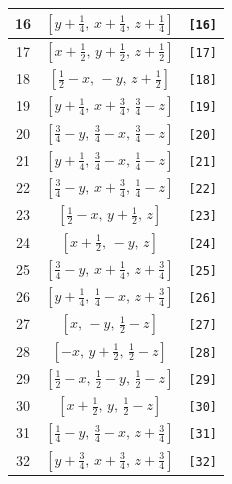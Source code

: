 \documentclass[fleqn,8pt]{jsarticle}
\begin{document}
\begin{longtable}{ccc}
16 & $\left[ y + \frac{1}{4},\, x + \frac{1}{4},\, z + \frac{1}{4} \right]$ & {\tt [16]} \\ \hline
17 & $\left[ x + \frac{1}{2},\, y + \frac{1}{2},\, z + \frac{1}{2} \right]$ & {\tt [17]} \\ \hline
18 & $\left[ \frac{1}{2} - x,\, - y,\, z + \frac{1}{2} \right]$ & {\tt [18]} \\ \hline
19 & $\left[ y + \frac{1}{4},\, x + \frac{3}{4},\, \frac{3}{4} - z \right]$ & {\tt [19]} \\ \hline
20 & $\left[ \frac{3}{4} - y,\, \frac{3}{4} - x,\, \frac{3}{4} - z \right]$ & {\tt [20]} \\ \hline
21 & $\left[ y + \frac{1}{4},\, \frac{3}{4} - x,\, \frac{1}{4} - z \right]$ & {\tt [21]} \\ \hline
22 & $\left[ \frac{3}{4} - y,\, x + \frac{3}{4},\, \frac{1}{4} - z \right]$ & {\tt [22]} \\ \hline
23 & $\left[ \frac{1}{2} - x,\, y + \frac{1}{2},\, z \right]$ & {\tt [23]} \\ \hline
24 & $\left[ x + \frac{1}{2},\, - y,\, z \right]$ & {\tt [24]} \\ \hline
25 & $\left[ \frac{3}{4} - y,\, x + \frac{1}{4},\, z + \frac{3}{4} \right]$ & {\tt [25]} \\ \hline
26 & $\left[ y + \frac{1}{4},\, \frac{1}{4} - x,\, z + \frac{3}{4} \right]$ & {\tt [26]} \\ \hline
27 & $\left[ x,\, - y,\, \frac{1}{2} - z \right]$ & {\tt [27]} \\ \hline
28 & $\left[ - x,\, y + \frac{1}{2},\, \frac{1}{2} - z \right]$ & {\tt [28]} \\ \hline
29 & $\left[ \frac{1}{2} - x,\, \frac{1}{2} - y,\, \frac{1}{2} - z \right]$ & {\tt [29]} \\ \hline
30 & $\left[ x + \frac{1}{2},\, y,\, \frac{1}{2} - z \right]$ & {\tt [30]} \\ \hline
31 & $\left[ \frac{1}{4} - y,\, \frac{3}{4} - x,\, z + \frac{3}{4} \right]$ & {\tt [31]} \\ \hline
32 & $\left[ y + \frac{3}{4},\, x + \frac{3}{4},\, z + \frac{3}{4} \right]$ & {\tt [32]} \\
\end{longtable}
\end{document}
